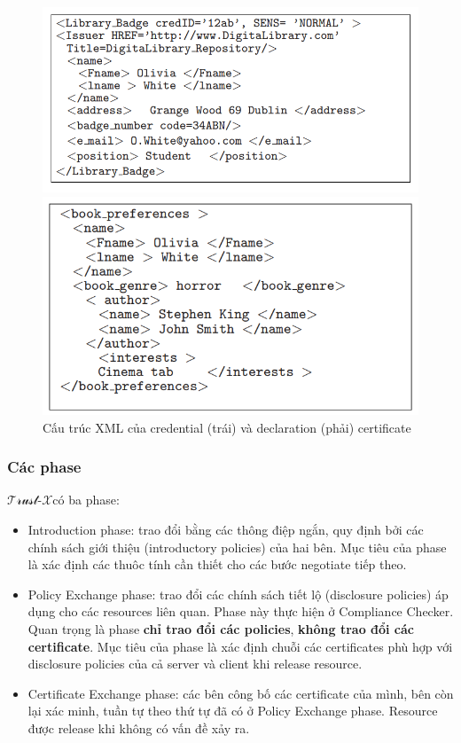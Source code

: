 \documentclass[12pt]{article}
\newcommand{\trustx}{$\mathcal{\text{Trust-}X}$}
\begin{document}
\begin{figure}[H]
\centering
\begin{multicols}{2}
\includegraphics[scale=.5]{img/trustx-credential.PNG}

\includegraphics[scale=.5]{img/trustx-declaration.PNG}
\end{multicols}
\caption{Cấu trúc XML của credential (trái) và declaration (phải) certificate}
\end{figure}

\subsubsection{Các phase}
\trustx có ba phase:
\begin{itemize}
\item Introduction phase: trao đổi bằng các thông điệp ngắn, quy định bởi các chính sách giới thiệu (introductory policies) của hai bên. Mục tiêu của phase là xác định các thuôc tính cần thiết cho các bước negotiate tiếp theo.
\item Policy Exchange phase: trao đổi các chính sách tiết lộ (disclosure policies) áp dụng cho các resources liên quan. Phase này thực hiện ở Compliance Checker. Quan trọng là phase \textbf{chỉ trao đổi các policies}, \textbf{không trao đổi các certificate}. Mục tiêu của phase là xác định chuỗi các certificates phù hợp với disclosure policies của cả server và client khi release resource.
\item Certificate Exchange phase: các bên công bố các certificate của mình, bên còn lại xác minh, tuần tự theo thứ tự đã có ở Policy Exchange phase. Resource được release khi không có vấn đề xảy ra.
\end{itemize}
\end{document}
